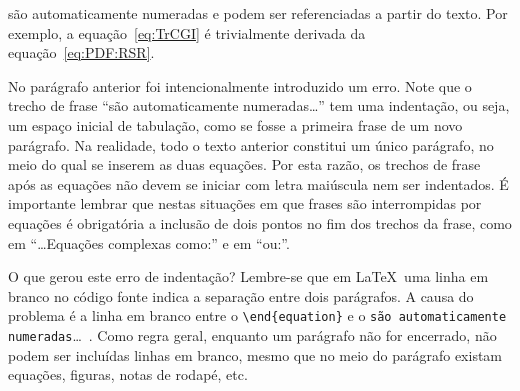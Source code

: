 são automaticamente numeradas e podem ser referenciadas a partir do
texto. Por exemplo, a equação~\ref{eq:TrCGI} é trivialmente derivada
da equação~\ref{eq:PDF:RSR}.

No parágrafo anterior foi intencionalmente introduzido um erro. Note
que o trecho de frase ``são automaticamente numeradas\dots'' tem uma
indentação, ou seja, um espaço inicial de tabulação, como se fosse a
primeira frase de um novo parágrafo. Na realidade, todo o texto
anterior constitui um único parágrafo, no meio do qual se inserem as
duas equações. Por esta razão, os trechos de frase após as equações
não devem se iniciar com letra maiúscula nem ser indentados. É
importante lembrar que nestas situações em que frases são
interrompidas por equações é obrigatória a inclusão de dois pontos no
fim dos trechos da frase, como em ``\dots Equações complexas como:'' e
em ``ou:''.

O que gerou este erro de indentação? Lembre-se que em \LaTeX\ uma
linha em branco no código fonte indica a separação entre dois
parágrafos. A causa do problema é a linha em branco entre o
\verb|\end{equation}| e o \texttt{são automaticamente
numeradas}\dots~. Como regra geral, enquanto um parágrafo não for
encerrado, não podem ser incluídas linhas em branco, mesmo que no meio
do parágrafo existam equações, figuras, notas de rodapé, etc.

